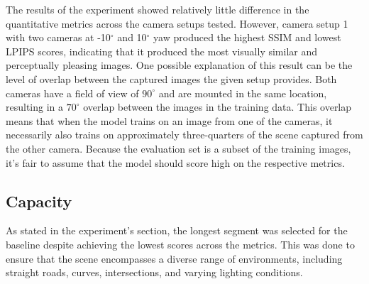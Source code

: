 The results of the experiment showed relatively little difference in the quantitative metrics across the camera setups tested. However, camera setup 1 with two cameras at -10$^{\circ}$ and 10$^{\circ}$ yaw produced the highest SSIM and lowest LPIPS scores, indicating that it produced the most visually similar and perceptually pleasing images. One possible explanation of this result can be the level of overlap between the captured images the given setup provides. Both cameras have a field of view of $90^\circ$ and are mounted in the same location, resulting in a $70^\circ$ overlap between the images in the training data. This overlap means that when the model trains on an image from one of the cameras, it necessarily also trains on approximately three-quarters of the scene captured from the other camera. Because the evaluation set is a subset of the training images, it's fair to assume that the model should score high on the respective metrics.


\begin{comment}
- The position of the camera was arbitrary. Could've done more research into how cameras on cars usually are rigged.
- The camera setups are very sparse, a lot of different possibilities.

Results:
- Relatively little difference in the quantitative results.
- Why did the -10 and 10 yaw yield the best SSIM and LPIPS?
- The evaluation images are a subset of the training images. Because the -10 and 10 have a lot of overlap, they have a lot of common training data which will allow the model to learn the scene which it is evaluated on, in turn yielding high scores on the chosen metrics.


This overlap allows the model to train and learn the scene which it is evaluated on, because the evaluation set is a subset of the training images, more than the other setups, and it'll naturally score high on the respective images.

the model to train on the partial scene with two times the amount of data, and since the evaluation set is a subset of the training images, it'll naturally score high on the respective images.

\end{comment}










\subsection{Capacity} 
As stated in the experiment's section, the longest segment was selected for the baseline despite achieving the lowest scores across the metrics. This was done to ensure that the scene encompasses a diverse range of environments, including straight roads, curves, intersections, and varying lighting conditions.

